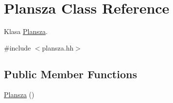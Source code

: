 \hypertarget{class_plansza}{\section{Plansza Class Reference}
\label{class_plansza}
}


Klasa \hyperlink{class_plansza}{Plansza}.  




{\ttfamily \#include $<$plansza.\+hh$>$}

\subsection*{Public Member Functions}
\begin{DoxyCompactItemize}
\item 
\hypertarget{class_plansza_ae58ab9e9e0a12c39f36750a0faa2c100}{\hyperlink{class_plansza_ae58ab9e9e0a12c39f36750a0faa2c100}{Plansza} ()}\label{class_plansza_ae58ab9e9e0a12c39f36750a0faa2c100}


\end{DoxyCompactItemize}
